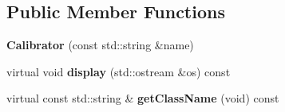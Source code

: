 \subsection*{Public Member Functions}
\begin{DoxyCompactItemize}
\item 
{\bfseries Calibrator} (const std\+::string \&name)\hypertarget{classdynamicgraph_1_1sot_1_1Calibrator_ab2b86fbd9baf92285ea9147c2157a614}{}\label{classdynamicgraph_1_1sot_1_1Calibrator_ab2b86fbd9baf92285ea9147c2157a614}

\item 
virtual void {\bfseries display} (std\+::ostream \&os) const \hypertarget{classdynamicgraph_1_1sot_1_1Calibrator_ad0ab88517b0d3fe66cc65eb44d604baf}{}\label{classdynamicgraph_1_1sot_1_1Calibrator_ad0ab88517b0d3fe66cc65eb44d604baf}

\item 
virtual const std\+::string \& {\bfseries get\+Class\+Name} (void) const \hypertarget{classdynamicgraph_1_1sot_1_1Calibrator_a43555b52b4bcf1bcceed1d1ab6962c56}{}\label{classdynamicgraph_1_1sot_1_1Calibrator_a43555b52b4bcf1bcceed1d1ab6962c56}

\end{DoxyCompactItemize}
